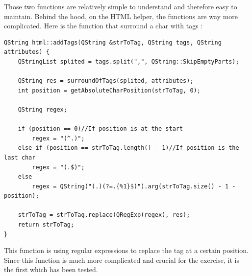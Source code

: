 Those two functions are relatively simple to understand and therefore easy to maintain. Behind the hood, on the HTML helper, the functions are way more complicated.
Here is the function that surround a char with tags :
\begin{lstlisting}
QString html::addTags(QString &strToTag, QString tags, QString attributes) {
    QStringList splited = tags.split(",", QString::SkipEmptyParts);

    QString res = surroundOfTags(splited, attributes);
    int position = getAbsoluteCharPosition(strToTag, 0);

    QString regex;

    if (position == 0)//If position is at the start
        regex = "(^.)";
    else if (position == strToTag.length() - 1)//If position is the last char
        regex = "(.$)";
    else
        regex = QString("(.)(?=.{%1}$)").arg(strToTag.size() - 1 - position);

    strToTag = strToTag.replace(QRegExp(regex), res);
    return strToTag;
}
\end{lstlisting}

This function is using regular expressions to replace the tag at a certain position. Since this function is much more complicated and crucial for the exercise, it is the first which has been tested.\\


